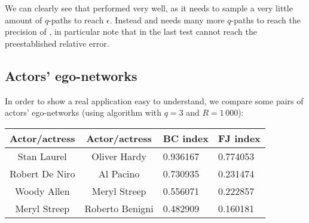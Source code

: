 	
	
	We can clearly see that \fcount performed very well, as it needs to sample a very little amount of $q$-paths to reach $\epsilon$.
	Instead \fsamp and \base needs many more $q$-paths to reach the precision of \fcount, in particular note that in the last test \base cannot reach the preestablished relative error.
	

	

	\subsection*{Actors' ego-networks}
	
	In order to show a real application easy to understand, we compare
	some pairs of actors' ego-networks (using \fcount algorithm with $q=3$ and $R=1\,000$):
	
	\begin{table}[h]
		\centering
		\begin{tabular}{c|c|l|l}
			Actor/actress & Actor/actress & BC index & FJ index\\ 
			\hline
			Stan Laurel & Oliver Hardy & 0.936167 & 0.774053 \\
			Robert De Niro & Al Pacino & 0.730935 & 0.231474\\
			Woody Allen & Meryl Streep & 0.556071 & 0.222857\\
			Meryl Streep & Roberto Benigni & 0.482909 & 0.160181\\
		\end{tabular}
	\end{table}

